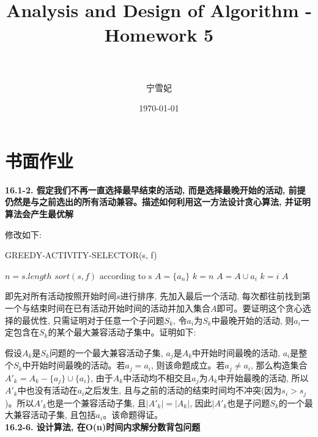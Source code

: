 \documentclass[paper=a4, fontsize=11pt]{scrartcl} %
\title{	
\normalfont \normalsize 
\horrule{0.5pt} \\[0.4cm] %
\huge Analysis and Design of Algorithm - Homework 5\\ %
\horrule{2pt} \\[0.5cm] %
}
\author{宁雪妃} %
\date{\normalsize\today} %
\numberwithin{equation}{section} %
\numberwithin{figure}{section} %
\numberwithin{table}{section} %
\begin{document}
\maketitle %


\section{书面作业}
\textbf{16.1-2. 假定我们不再一直选择最早结束的活动, 而是选择最晚开始的活动, 前提仍然是与之前选出的所有活动兼容。描述如何利用这一方法设计贪心算法, 并证明算法会产生最优解}

修改如下:
\begin{algorithm}[ht]
  \caption{GREEDY-ACTIVITY-SELECTOR(s, f)}
  \begin{algorithmic}[1]
    \State $n = s.length$
    \State $sort(s, f) \mbox{ according to s}$
    \State $A = \{a_n\}$
    \State $k = n$
    \State $A = A \cup a_i$
    \State $k=i$
    \EndIf
    \EndFor
  \State\Return $A$
  \end{algorithmic}
\end{algorithm}

即先对所有活动按照开始时间$s$进行排序, 先加入最后一个活动, 每次都往前找到第一个与结束时间在已有活动开始时间的活动并加入集合$A$即可。要证明这个贪心选择的最优性, 只需证明对于任意一个子问题$S_k$, 令$a_i$为$S_k$中最晚开始的活动, 则$a_i$一定包含在$S_k$的某个最大兼容活动子集中。证明如下:

假设$A_k$是$S_k$问题的一个最大兼容活动子集, $a_j$是$A_k$中开始时间最晚的活动, $a_i$是整个$S_k$中开始时间最晚的活动。若$a_j = a_i$, 则该命题成立。若$a_j \neq a_i$, 那么构造集合$A'_k = A_k - \{a_j\} \cup \{a_i\}$, 由于$A_k$中活动均不相交且$a_j$为$A_k$中开始最晚的活动, 所以$A'_k$中也没有活动在$a_i$之后发生, 且与之前的活动的结束时间均不冲突(因为$s_i > s_j$)。所以$A'_k$也是一个兼容活动子集, 且$|A'_k| = |A_k|$, 因此$|A'_k$也是子问题$S_k$的一个最大兼容活动子集, 且包括$a_i$。该命题得证。
\\[4ex]

\textbf{16.2-6. 设计算法, 在O(n)时间内求解分数背包问题}
\end{document}

